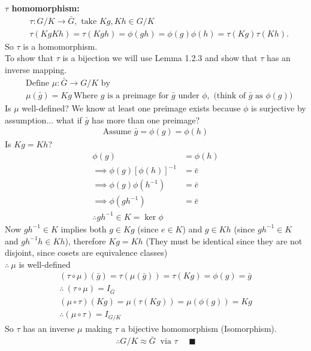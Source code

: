 \begin{theorem}
\textbf{$\tau$ homomorphism:}\\
\begin{align}
    &\tau : G/K \rightarrow \bar{G}, \text{ take } Kg,Kh\in G/K \nonumber \\
    &\tau(KgKh)=\tau(Kgh)=\phi(gh)=\phi(g)\phi(h)= \tau(Kg)\tau(Kh). \nonumber
\end{align}
So $\tau$ is a homomorphism.\\
To show that $\tau$ is a bijection we will use Lemma 1.2.3 and show that $\tau$ has an inverse
mapping. \\
\begin{align}
    &\text{Define }\mu : \bar{G}\rightarrow G/K \text{ by }\nonumber \\
    &\mu(\bar{g})=Kg \ \text{Where }g\text{ is a preimage for }\bar{g} \text{ under }\phi, \text{  (think of $\bar{g}$ as $\phi(g)$)} \nonumber
\end{align}
Is $\mu$ well-defined? We know at least one preimage exists because $\phi$ is surjective by
assumption... what if $\bar{g}$ has more than one preimage?
\begin{align}
    \text{Assume } \bar{g}=\phi(g)=\phi(h) \nonumber
\end{align}
Is $Kg=Kh$?
\begin{align}
    \phi(g)&=\phi(h) \nonumber \\
    \implies \phi(g)[\phi(h)]^{-1}&=\bar{e} \nonumber \\
    \implies \phi(g)\phi(h^{-1})&=\bar{e} \nonumber \\
    \implies \phi(gh^{-1})&=\bar{e} \nonumber \\
    \therefore gh^{-1}\in K = \ker\phi \nonumber
\end{align}
Now $gh^{-1} \in K$ implies both $g\in Kg$ (since $e\in K$) and $g\in Kh$ (since $gh^{-1} \in K$ and
$gh^{-1}h\in Kh$), therefore $Kg=Kh$ (They must be identical since they are not disjoint, since
cosets are equivalence classes)\\
$\therefore \ \mu$ is well-defined
\begin{align}
    (\tau \circ \mu)(\bar{g})=\tau(\mu(\bar{g}))=\tau(Kg)=\phi(g)=\bar{g} \nonumber \\
    \therefore \ (\tau\circ\mu)= I_{\bar{G}} \nonumber \\
    (\mu \circ \tau)(Kg)=\mu(\tau(Kg))=\mu(\phi(g))=Kg \nonumber \\
    \therefore (\mu\circ\tau)=I_{G/K} \nonumber
\end{align}
So $\tau$ has an inverse $\mu$ making $\tau$ a bijective homomorphism (Isomorphism).
\begin{align}
    \therefore G/K \approx \bar{G} \ \text{ via } \tau \ \ \ \ \ \ \blacksquare \nonumber
\end{align}
\end{theorem}

